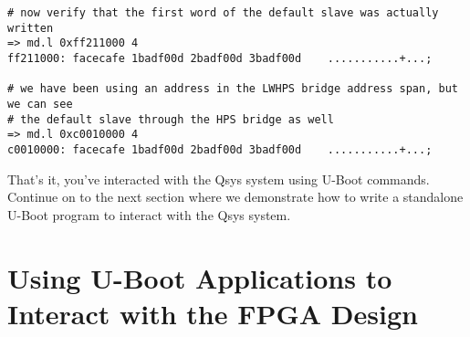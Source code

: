\begin{flushleft}
\begin{enumerate}[
	label=\textbf{Step \arabic*.},
	leftmargin=*,
	widest={00},
	align=left]
\begin{enumerate}[
	label=\textbf{Step \arabic{enumi}\alph*.},
	leftmargin=*,
	align=left]
\begin{verbatim}
# now verify that the first word of the default slave was actually written
=> md.l 0xff211000 4
ff211000: facecafe 1badf00d 2badf00d 3badf00d    ...........+...;

# we have been using an address in the LWHPS bridge address span, but we can see
# the default slave through the HPS bridge as well
=> md.l 0xc0010000 4
c0010000: facecafe 1badf00d 2badf00d 3badf00d    ...........+...;

\end{verbatim}

\end{enumerate}

\end{enumerate}

That's it, you've interacted with the Qsys system using U-Boot commands.  Continue on to the next section where we demonstrate how to write a standalone U-Boot program to interact with the Qsys system.

\end{flushleft}

\section*{Using U-Boot Applications to Interact with the FPGA Design}

